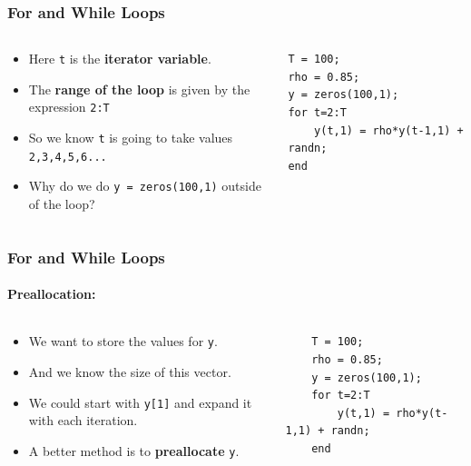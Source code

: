 \documentclass[11pt,xcolor={svgnames},aspectratio=169,usepdftitle=false,notheorems]{beamer}
\begin{document}
\begin{frame}[fragile]
    \frametitle{For and While Loops}
\begin{columns}
    \begin{column}{0.5\textwidth}
        \begin{itemize}
            \item Here \verb;t; is the \alert{\textbf{iterator variable}}.
            \item The \alert{\textbf{range of the loop}} is given by the expression \verb;2:T;
            \item So we know \verb;t; is going to take values \verb;2,3,4,5,6...;
            \item Why do we do \verb;y = zeros(100,1); outside of the loop?
        \end{itemize}
    \end{column}
\begin{column}{0.5\textwidth}
\begin{lstlisting}
T = 100;
rho = 0.85;
y = zeros(100,1);
for t=2:T
    y(t,1) = rho*y(t-1,1) + randn;
end
\end{lstlisting}
\end{column}
\end{columns}
\end{frame}

\begin{frame}[fragile]
    \frametitle{For and While Loops}
    \framesubtitle{Preallocation:}
    \begin{columns}
        \begin{column}{0.5\textwidth}
            \begin{itemize}
                \item We want to store the values for \verb;y;.
                \item And we know the size of this vector.
                \item We could start with \verb;y[1]; and expand it with each iteration.
                \item A better method is to \alert{\textbf{preallocate}} \verb;y;.
            \end{itemize}
        \end{column}
    \begin{column}{0.5\textwidth}
    \begin{lstlisting}
    T = 100;
    rho = 0.85;
    y = zeros(100,1);
    for t=2:T
        y(t,1) = rho*y(t-1,1) + randn;
    end
    \end{lstlisting}
    \end{column}
    \end{columns}    
\end{frame}
\end{document}
